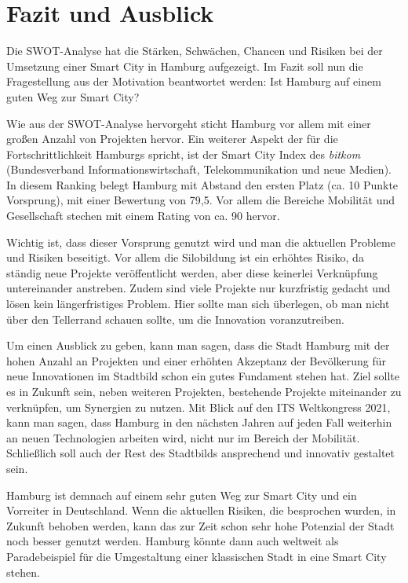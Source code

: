 \section{Fazit und Ausblick}
\label{sec:fazit}

Die SWOT-Analyse hat die Stärken, Schwächen, Chancen und Risiken bei der Umsetzung einer Smart City in Hamburg aufgezeigt. Im Fazit soll nun die Fragestellung aus der Motivation beantwortet werden: Ist Hamburg auf einem guten Weg zur Smart City? 

Wie aus der SWOT-Analyse hervorgeht sticht Hamburg vor allem mit einer großen Anzahl von Projekten hervor. Ein weiterer Aspekt der für die Fortschrittlichkeit Hamburgs spricht, ist der Smart City Index des \textit{bitkom} (Bundesverband Informationswirtschaft, Telekommunikation und neue Medien). In diesem Ranking belegt Hamburg mit Abstand den ersten Platz (ca. 10 Punkte Vorsprung), mit einer Bewertung von 79,5. Vor allem die Bereiche Mobilität und Gesellschaft stechen mit einem Rating von ca. 90 hervor. \autocite[vgl.][]{bitkom.2019}

Wichtig ist, dass dieser Vorsprung genutzt wird und man die aktuellen Probleme und Risiken beseitigt. Vor allem die Silobildung ist ein erhöhtes Risiko, da ständig neue Projekte veröffentlicht werden, aber diese keinerlei Verknüpfung untereinander anstreben. Zudem sind viele Projekte nur kurzfristig gedacht und lösen kein längerfristiges Problem. Hier sollte man sich überlegen, ob man nicht über den Tellerrand schauen sollte, um die Innovation voranzutreiben.

Um einen Ausblick zu geben, kann man sagen, dass die Stadt Hamburg mit der hohen Anzahl an Projekten und einer erhöhten Akzeptanz der Bevölkerung für neue Innovationen im Stadtbild schon ein gutes Fundament stehen hat. Ziel sollte es in Zukunft sein, neben weiteren Projekten, bestehende Projekte miteinander zu verknüpfen, um Synergien zu nutzen. Mit Blick auf den ITS Weltkongress 2021, kann man sagen, dass Hamburg in den nächsten Jahren auf jeden Fall weiterhin an neuen Technologien arbeiten wird, nicht nur im Bereich der Mobilität. Schließlich soll auch der Rest des Stadtbilds ansprechend und innovativ gestaltet sein.

Hamburg ist demnach auf einem sehr guten Weg zur Smart City und ein Vorreiter in Deutschland. Wenn die aktuellen Risiken, die besprochen wurden, in Zukunft behoben werden, kann das zur Zeit schon sehr hohe Potenzial der Stadt noch besser genutzt werden. Hamburg könnte dann auch weltweit als Paradebeispiel für die Umgestaltung einer klassischen Stadt in eine Smart City stehen.



